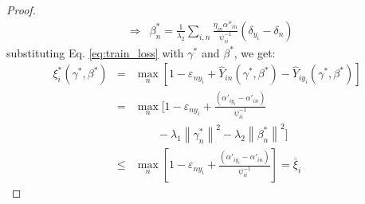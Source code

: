 \begin{proof}
\begin{eqnarray}
&\Rightarrow &\beta _n^* = \frac{1}{{{\lambda _2}}}\sum\limits_{i,n} {\frac{{{\eta _{in}}{{\alpha ''}_{in}}}}{{\psi _{ii}^{ - 1}}}\left( {{\delta _{{y_i}}} - {\delta _n}} \right)} 
\end{eqnarray}
substituting Eq. \eqref{eq:train_loss} with $\gamma^*$ and $\beta^*$, we get:
\begin{eqnarray*}
 {\xi_i^*}\left( {{\gamma ^*},{\beta ^*}} \right) &  =& \mathop {\max }\limits_n \left[ {1 - {\varepsilon _{n{y_i}}} + {{\hat Y}_{in}}\left( {{\gamma ^*},{\beta ^*}} \right) - {{\hat Y}_{i{y_i}}}\left( {{\gamma ^*},{\beta ^*}} \right)} \right] \\
   &  =& \mathop {\max }\limits_n \Big [ 1 - {\varepsilon _{n{y_i}}} + \frac{{\left( {{{\alpha '}_{i{y_i}}} - {{\alpha '}_{in}}} \right)}}{{\psi_{ii}^{ - 1}}} \\
   &&\qquad {}- {\lambda _1}{{\left\| {{\gamma_n ^*}} \right\|}^2} - {\lambda _2}{{\left\| {{\beta_n ^*}} \right\|}^2} \Big ]\\
   & \le& \mathop {\max }\limits_n \left[ {1 - {\varepsilon _{n{y_i}}} + \frac{{\left( {{{\alpha '}_{i{y_i}}} - {{\alpha '}_{in}}} \right)}}{{\psi _{ii}^{ - 1}}}} \right] =\bar \xi_i
\end{eqnarray*}

\end{proof}